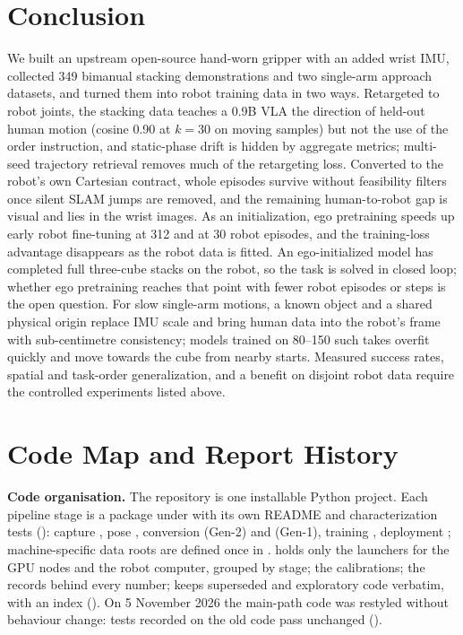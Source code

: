 \documentclass[conference,10pt]{IEEEtran}
\begin{document}
\section{Conclusion}
We built an upstream open-source hand-worn gripper with an added wrist IMU, collected 349 bimanual stacking demonstrations and two
single-arm approach datasets, and turned them into robot training data in two ways. Retargeted to robot joints, the stacking data
teaches a 0.9B VLA the direction of held-out human motion (cosine 0.90 at $k{=}30$ on moving samples) but not the use of the order
instruction, and static-phase drift is hidden by aggregate metrics; multi-seed trajectory retrieval removes much of the retargeting
loss. Converted to the robot's own Cartesian contract, whole episodes survive without feasibility filters once silent SLAM jumps are
removed, and the remaining human-to-robot gap is visual and lies in the wrist images. As an initialization, ego pretraining speeds up
early robot fine-tuning at 312 and at 30 robot episodes, and the training-loss advantage disappears as the robot data is fitted. An
ego-initialized model has completed full three-cube stacks on the robot, so the task is solved in closed loop; whether ego pretraining
reaches that point with fewer robot episodes or steps is the open question. For slow single-arm motions, a known object and a shared
physical origin replace IMU scale and bring human data into the robot's frame with sub-centimetre consistency; models trained on
80--150 such takes overfit quickly and move towards the cube from nearby starts. Measured success rates, spatial and task-order
generalization, and a benefit on disjoint robot data require the controlled experiments listed above.

\appendices
\section{Code Map and Report History}\label{app:code}
\textbf{Code organisation.} The repository is one installable Python project. Each pipeline stage is a package under
 with its own README and characterization tests (): capture ,
pose , conversion  (Gen-2) and  (Gen-1), training
, deployment ; machine-specific data roots are defined once in .
 holds only the launchers for the GPU nodes and the robot computer, grouped by stage;  the
calibrations;  the records behind every number;  keeps superseded and exploratory code verbatim,
with an index (). On 5 November 2026 the main-path code was restyled without behaviour change: tests
recorded on the old code pass unchanged ().
\end{document}

